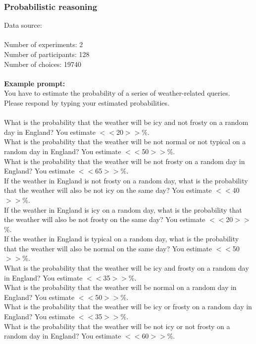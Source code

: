 \documentclass[pdflatex,sn-nature]{sn-jnl}%
\theoremstyle{thmstyleone}%
\theoremstyle{thmstyletwo}%
\theoremstyle{thmstylethree}%
\begin{document}
\subsubsection*{Probabilistic reasoning}
Data source: \cite{zhu2020bayesian} \\ $~$ \\
Number of experiments: 2 $~$\\ 
Number of participants: 128 $~$\\ 
Number of choices: 19740 $~$\\ 
 $~$\\ 
\textbf{Example prompt:}
 $~$\\ 
You have to estimate the probability of a series of weather-related queries. $~$\\ 
Please respond by typing your estimated probabilities. $~$\\ 
 $~$\\ 
What is the probability that the weather will be icy and not frosty on a random day in England? You estimate $<<$20$>>$\%. $~$\\ 
What is the probability that the weather will be not normal or not typical on a random day in England? You estimate $<<$50$>>$\%. $~$\\ 
What is the probability that the weather will be not frosty on a random day in England? You estimate $<<$65$>>$\%. $~$\\ 
If the weather in England is not frosty on a random day, what is the probability that the weather will also be not icy on the same day? You estimate $<<$40$>>$\%. $~$\\ 
If the weather in England is icy on a random day, what is the probability that the weather will also be not frosty on the same day? You estimate $<<$20$>>$\%. $~$\\ 
If the weather in England is typical on a random day, what is the probability that the weather will also be normal on the same day? You estimate $<<$50$>>$\%. $~$\\ 
What is the probability that the weather will be icy and frosty on a random day in England? You estimate $<<$35$>>$\%. $~$\\ 
What is the probability that the weather will be normal on a random day in England? You estimate $<<$50$>>$\%. $~$\\ 
What is the probability that the weather will be icy or frosty on a random day in England? You estimate $<<$35$>>$\%. $~$\\ 
What is the probability that the weather will be not icy or not frosty on a random day in England? You estimate $<<$60$>>$\%. $~$\\ 
\end{document}
